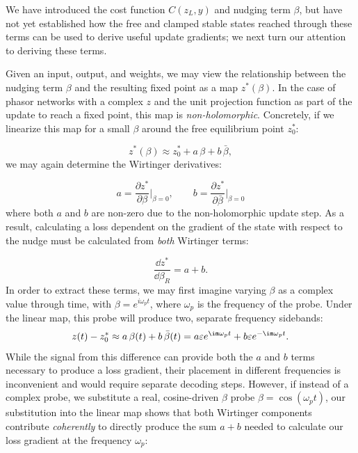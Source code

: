 We have introduced the cost function $C(z_L,y)$ and nudging term $\beta$, but have not yet established how the free and clamped stable states reached through these terms can be used to derive useful update gradients; we next turn our attention to deriving these terms. 

Given an input, output, and weights, we may view the relationship between the nudging term $\beta$ and the resulting fixed point as a map $z^*(\beta)$. In the case of phasor networks with a complex $z$ and the unit projection function as part of the update to reach a fixed point, this map is \textit{non-holomorphic}. Concretely, if we linearize this map for a small $\beta$ around the free equilibrium point $z^*_0$:

\begin{equation}
z^*(\beta) \approx z_0^* + a\,\beta + b\,\bar{\beta},
\end{equation}
we may again determine the Wirtinger derivatives:

\begin{equation}
a = \frac{\partial z^*}{\partial \beta}\Big|_{\beta=0},
\qquad
b = \frac{\partial z^*}{\partial \bar{\beta}}\Big|_{\beta=0}
\end{equation}
where both $a$ and $b$ are non-zero due to the non-holomorphic update step. As a result, calculating a loss dependent on the gradient of the state with respect to the nudge must be calculated from \textit{both} Wirtinger terms:

\begin{equation}
\frac{\dd z^*}{\dd \beta_R} = a + b.
\end{equation}
In order to extract these terms, we may first imagine varying $\beta$ as a complex value through time, with $\beta=e^{i\omega_p t}$, where $\omega_p$ is the frequency of the probe. Under the linear map, this probe will produce two, separate frequency sidebands:
\begin{equation}
z(t) - z_0^* \approx a\,\beta(t) + b\,\bar{\beta}(t) = a\varepsilon e^{\im\omega_p t} + b\varepsilon e^{-\im\omega_p t}.
\end{equation}
While the signal from this difference can provide both the $a$ and $b$ terms necessary to produce a loss gradient, their placement in different frequencies is inconvenient and would require separate decoding steps. However, if instead of a complex probe, we substitute a real, cosine-driven $\beta$ probe $\beta = \cos(\omega_p t)$, our substitution into the linear map shows that both Wirtinger components contribute \emph{coherently} to directly produce the sum $a+b$ needed to calculate our loss gradient at the frequency $\omega_p$:


